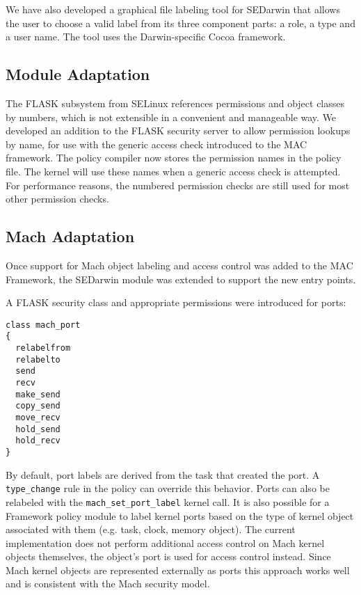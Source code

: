 We have also developed a graphical file labeling tool for SEDarwin
that allows the user to choose a valid label from its three component
parts: a role, a type and a user name.  The tool uses the Darwin-specific
Cocoa framework.

\subsection{Module Adaptation}

The FLASK subsystem from SELinux references permissions and object
classes by numbers, which is not extensible in a convenient and
manageable way. We developed an addition to the FLASK security
server to allow permission lookups by name, for use with the generic
access check introduced to the MAC framework.  The policy compiler
now stores the permission names in the policy file. The kernel will
use these names when a generic access check is attempted. For
performance reasons, the numbered permission checks are still used
for most other permission checks.

\subsection{Mach Adaptation}

Once support for Mach object labeling and access control was added
to the MAC Framework, the SEDarwin module was extended to support
the new entry points.
\begin{samepage}
A FLASK security class and appropriate permissions
were introduced for ports:

\begin{verbatim}
class mach_port
{
  relabelfrom
  relabelto
  send
  recv
  make_send
  copy_send
  move_recv
  hold_send
  hold_recv
}
\end{verbatim}
\end{samepage}

By default, port labels are derived from the task that created the
port.  A {\tt type\_change} rule in the policy can override this
behavior. Ports can also be relabeled with the {\tt mach\_set\_port\_label}
kernel call.  It is also possible for a Framework policy module to
label kernel ports based on the type of kernel object associated
with them (e.g. task, clock, memory object). The current implementation
does not perform additional access control on Mach kernel objects
themselves, the object's port is used for access control instead.
Since Mach kernel objects are represented externally as ports this
approach works well and is consistent with the Mach security model.
